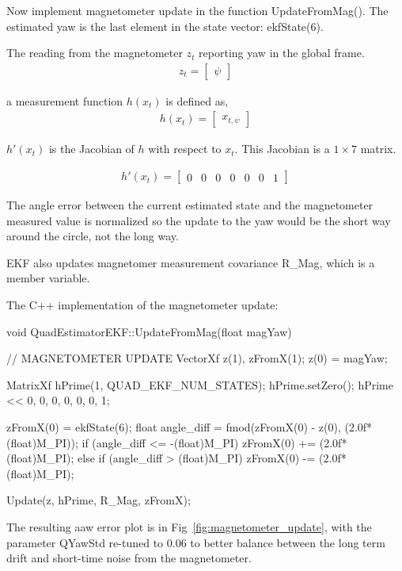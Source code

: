\documentclass[letterpaper]{article}
\begin{document}
Now implement magnetometer update in the function UpdateFromMag(). The estimated yaw is the last element in the state vector: ekfState(6).

The reading from the magnetometer $z_t$ reporting yaw in the global frame.
\begin{align*}
  z_t=  \left[\begin{array}{c}
      \psi
      \end{array}\right]
  \end{align*}

a measurement function $h(x_t)$ is defined as,
\begin{align*}
  h(x_t) =  \left[\begin{array}{c}
      x_{t,\psi}
      \end{array}\right]
\end{align*}

$h'(x_t)$ is the Jacobian of $h$ with respect to $x_t$. This Jacobian is a $1 \times 7$ matrix.

\begin{align*}
  h'(x_t) = \left[\begin{array}{ccccccc}
      0&0&0&0&0&0&1
      \end{array}\right]
\end{align*}

The angle error between the current estimated state and the magnetometer measured value is normalized so the update to the yaw would be the short way around the circle, not the long way.

EKF also updates magnetomer measurement covariance R\_Mag, which is a member variable.

The C++ implementation of the magnetometer update:
\begin{CPP}
void QuadEstimatorEKF::UpdateFromMag(float magYaw)
{
    // MAGNETOMETER UPDATE
    VectorXf z(1), zFromX(1);
    z(0) = magYaw;

    MatrixXf hPrime(1, QUAD_EKF_NUM_STATES);
    hPrime.setZero();
     hPrime << 0, 0, 0, 0, 0, 0, 1;

    zFromX(0) = ekfState(6);
    float angle_diff = fmod(zFromX(0) - z(0), (2.0f*(float)M_PI));
    if (angle_diff <= -(float)M_PI)
        zFromX(0) += (2.0f*(float)M_PI);
    else if (angle_diff > (float)M_PI)
        zFromX(0) -= (2.0f*(float)M_PI);

    Update(z, hPrime, R_Mag, zFromX);
}
\end{CPP}

The resulting aaw error plot is in Fig~\ref{fig:magnetometer_update}, with the parameter QYawStd re-tuned to 0.06 to better balance between the long term drift and short-time noise from the magnetometer.
\end{document}
